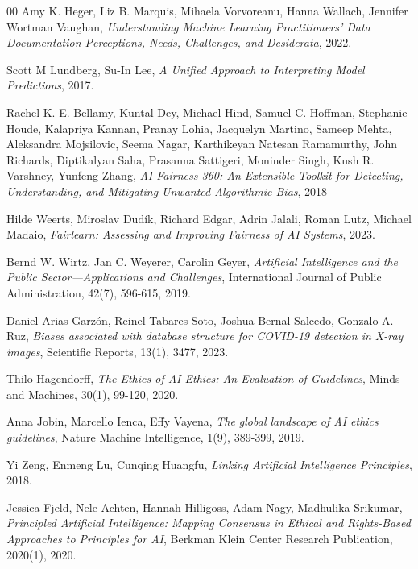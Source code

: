 \documentclass[fleqn,10pt]{wlscirep}
\begin{document}
\begin{thebibliography}{00}
  Amy K. Heger, Liz B. Marquis, Mihaela Vorvoreanu, Hanna Wallach, Jennifer Wortman Vaughan,
  \textit{Understanding Machine Learning Practitioners' Data Documentation Perceptions, Needs, Challenges, and Desiderata},
  2022.


  Scott M Lundberg, Su-In Lee,
  \textit{A Unified Approach to Interpreting Model Predictions},
  2017.


  Rachel K. E. Bellamy, Kuntal Dey, Michael Hind, Samuel C. Hoffman, Stephanie Houde, Kalapriya Kannan, Pranay Lohia, Jacquelyn Martino, Sameep Mehta, Aleksandra Mojsilovic, Seema Nagar, Karthikeyan Natesan Ramamurthy, John Richards, Diptikalyan Saha, Prasanna Sattigeri, Moninder Singh, Kush R. Varshney, Yunfeng Zhang,
  \textit{{AI Fairness} 360:  An Extensible Toolkit for Detecting, Understanding, and Mitigating Unwanted Algorithmic Bias},
  {2018}   %


  Hilde Weerts, Miroslav Dudík, Richard Edgar, Adrin Jalali, Roman Lutz, Michael Madaio,
  \textit{Fairlearn: Assessing and Improving Fairness of AI Systems},
  2023.


  Bernd W. Wirtz, Jan C. Weyerer, Carolin Geyer,
  \textit{Artificial Intelligence and the Public Sector—Applications and Challenges},
  International Journal of Public Administration,
  42(7),
  596-615,
  2019.


  Daniel Arias-Garzón, Reinel Tabares-Soto, Joshua Bernal-Salcedo, Gonzalo A. Ruz,
  \textit{Biases associated with database structure for COVID-19 detection in X-ray images},
  Scientific Reports,
  13(1),
  3477,
  2023.


  Thilo Hagendorff,
  \textit{The Ethics of AI Ethics: An Evaluation of Guidelines},
  Minds and Machines,
  30(1),
  99-120,
  2020.


  Anna Jobin, Marcello Ienca, Effy Vayena,
  \textit{The global landscape of AI ethics guidelines},
  Nature Machine Intelligence,
  1(9),
  389-399,
  2019.


  Yi Zeng, Enmeng Lu, Cunqing Huangfu,
  \textit{Linking Artificial Intelligence Principles},
  2018.


  Jessica Fjeld, Nele Achten, Hannah Hilligoss, Adam Nagy, Madhulika Srikumar,
  \textit{Principled Artificial Intelligence: Mapping Consensus in Ethical and Rights-Based Approaches to Principles for AI},
  Berkman Klein Center Research Publication,
  2020(1),
  2020.



\end{thebibliography}
\end{document}
